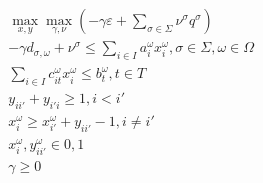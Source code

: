 \vst {}
\begin{subequations}\label{DROMultiDKP}
\begin{eqnarray}
& & \max_{x, y} \max_{\gamma, \nu} (-\gamma \varepsilon + \sum_{\sigma \in \Sigma} \nu^\sigma q^\sigma)  \\
& &  -\gamma d_{\sigma, \omega} + \nu^\sigma \le \sum _{i \in I} a_{i}^{ \omega }x_{i}^{ \omega }, \sigma \in \Sigma, \omega \in \Omega \\
& & \sum_{i \in I} c_{it}^\omega x_{i}^\omega \leq b_{t}^\omega, t\in T \\
& & y_{ii'} + y_{i'i} \geq 1, i<i'  \\
& & x_{i}^\omega \geq x_{i'}^\omega + y_{ii'}-1, i\neq i' \\
& & x_{i}^\omega, y_{ii'}^\omega \in {0, 1} \\
& & \gamma \ge 0
\end{eqnarray}
\end{subequations}

